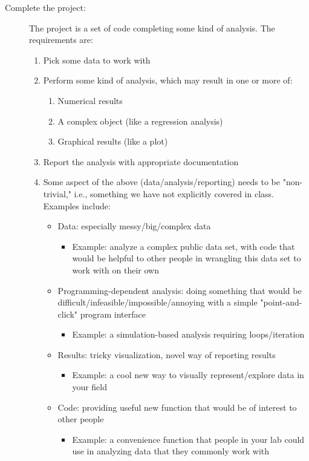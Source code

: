 \documentclass{tufte-handout}
\begin{document}
\begin{description}
\item[{Complete the project:}] The project is a set of code completing some kind of analysis. The requirements are:
\begin{enumerate}
\item Pick some data to work with
\item Perform some kind of analysis, which may result in one or more of:
\begin{enumerate}
\item Numerical results
\item A complex object (like a regression analysis)
\item Graphical results (like a plot)
\end{enumerate}
\item Report the analysis with appropriate documentation
\item Some aspect of the above (data/analysis/reporting) needs to be "non-trivial," i.e., something we have not explicitly covered in class.  Examples include:
\begin{itemize}
\item Data: especially messy/big/complex data
\begin{itemize}
\item Example: analyze a complex public data set, with code that would be helpful to other people in wrangling this data set to work with on their own
\end{itemize}
\item Programming-dependent analysis: doing something that would be difficult/infeasible/impossible/annoying with a simple "point-and-click" program interface
\begin{itemize}
\item Example: a simulation-based analysis requiring loops/iteration
\end{itemize}
\item Results: tricky visualization, novel way of reporting results
\begin{itemize}
\item Example: a cool new way to visually represent/explore data in your field
\end{itemize}
\item Code: providing useful new function that would be of interest to other people
\begin{itemize}
\item Example: a convenience function that people in your lab could use in analyzing data that they commonly work with

\end{itemize}
\end{itemize}
\end{enumerate}
\end{description}
\end{document}
